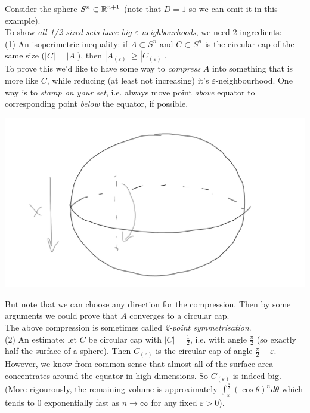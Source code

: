 \documentclass[a4paper]{article}
\begin{document}
\begin{eg}
    Consider the sphere $S^n \subset \mathbb{R}^{n+1}$ (note that $D=1$ so we can omit it in this example).\\
    To show \emph{all 1/2-sized sets have big $\varepsilon$-neighbourhoods}, we need 2 ingredients:\\
    (1) An isoperimetric inequality: if $A \subset S^n$ and $C \subset S^n$ is the circular cap of the same size ($|C| = |A|$), then $|A_{(\varepsilon)}|\geq |C_{(\varepsilon)}|$.\\
    To prove this we'd like to have some way to \emph{compress} $A$ into something that is more like $C$, while reducing (at least not increasing) it's $\varepsilon$-neighbourhood. One way is to \emph{stamp on your set}, i.e. always move point \emph{above} equator to corresponding point \emph{below} the equator, if possible.

    \includegraphics[scale=0.5]{image/Comb_03.png}

    But note that we can choose any direction for the compression. Then by some arguments we could prove that $A$ converges to a circular cap.\\
    The above compression is sometimes called \emph{2-point symmetrisation}.\\
    (2) An estimate: let $C$ be circular cap with $|C| = \frac{1}{2}$, i.e. with angle $\frac{\pi}{2}$ (so exactly half the surface of a sphere). Then $C_{(\varepsilon)}$ is the circular cap of angle $\frac{\pi}{2}+\varepsilon$.\\
    However, we know from common sense that almost all of the surface area concentrates around the equator in high dimensions. So $C_{(\varepsilon)}$ is indeed big.\\
    (More rigourously, the remaining volume is approximately $\int_\varepsilon^{\frac{\pi}{2}} (\cos \theta)^n d\theta$ which tends to $0$ exponentially fast as $n \to \infty$ for any fixed $\varepsilon>0$).
\end{eg}
\end{document}
